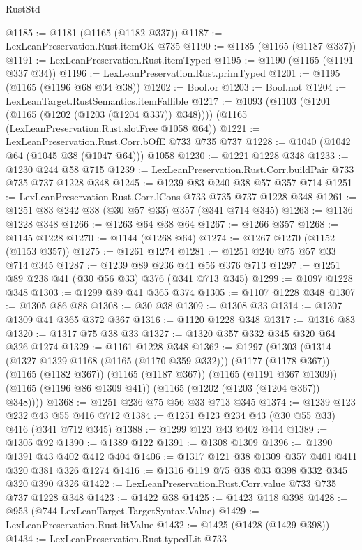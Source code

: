 \begin{lexlean}{RustStd}
\begin{coremodule}
@1185 := @1181 (@1165 (@1182 @337))
@1187 := LexLeanPreservation.Rust.itemOK @735
@1190 := @1185 (@1165 (@1187 @337))
@1191 := LexLeanPreservation.Rust.itemTyped
@1195 := @1190 (@1165 (@1191 @337 @34))
@1196 := LexLeanPreservation.Rust.primTyped
@1201 := @1195 (@1165 (@1196 @68 @34 @38))
@1202 := Bool.or
@1203 := Bool.not
@1204 := LexLeanTarget.RustSemantics.itemFallible
@1217 := @1093
    (@1103 (@1201 (@1165 (@1202 (@1203 (@1204 @337)) @348))))
    (@1165 (LexLeanPreservation.Rust.slotFree @1058 @64))
@1221 := LexLeanPreservation.Rust.Corr.bOfE @733 @735 @737
@1228 := @1040 (@1042 @64 (@1045 @38 (@1047 @64))) @1058
@1230 := @1221 @1228 @348
@1233 := @1230 @244 @58 @715
@1239 := LexLeanPreservation.Rust.Corr.buildPair @733 @735 @737 @1228 @348
@1245 := @1239 @83 @240 @38 @57 @357 @714
@1251 := LexLeanPreservation.Rust.Corr.lCons @733 @735 @737 @1228 @348
@1261 := @1251 @83 @242 @38 (@30 @57 @33) @357 (@341 @714 @345)
@1263 := @1136 @1228 @348
@1266 := @1263 @64 @38 @64
@1267 := @1266 @357
@1268 := @1145 @1228
@1270 := @1144 (@1268 @64)
@1274 := @1267 @1270 (@1152 (@1153 @357))
@1275 := @1261 @1274
@1281 := @1251 @240 @75 @57 @33 @714 @345
@1287 := @1239 @89 @236 @41 @56 @376 @713
@1297 := @1251 @89 @238 @41 (@30 @56 @33) @376 (@341 @713 @345)
@1299 := @1097 @1228 @348
@1303 := @1299 @89 @41 @365 @374
@1305 := @1107 @1228 @348
@1307 := @1305 @86 @88
@1308 := @30 @38
@1309 := @1308 @33
@1314 := @1307 @1309 @41 @365 @372 @367
@1316 := @1120 @1228 @348
@1317 := @1316 @83
@1320 := @1317 @75 @38 @33
@1327 := @1320 @357 @332 @345 @320 @64 @326 @1274
@1329 := @1161 @1228 @348
@1362 := @1297
    (@1303
      (@1314
        (@1327 @1329 @1168 (@1165 (@1170 @359 @332)))
        (@1177 (@1178 @367))
        (@1165 (@1182 @367))
        (@1165 (@1187 @367))
        (@1165 (@1191 @367 @1309))
        (@1165 (@1196 @86 @1309 @41))
        (@1165 (@1202 (@1203 (@1204 @367)) @348))))
@1368 := @1251 @236 @75 @56 @33 @713 @345
@1374 := @1239 @123 @232 @43 @55 @416 @712
@1384 := @1251 @123 @234 @43 (@30 @55 @33) @416 (@341 @712 @345)
@1388 := @1299 @123 @43 @402 @414
@1389 := @1305 @92
@1390 := @1389 @122
@1391 := @1308 @1309
@1396 := @1390 @1391 @43 @402 @412 @404
@1406 := @1317 @121 @38 @1309 @357 @401 @411 @320 @381 @326 @1274
@1416 := @1316 @119 @75 @38 @33 @398 @332 @345 @320 @390 @326
@1422 := LexLeanPreservation.Rust.Corr.value @733 @735 @737 @1228 @348
@1423 := @1422 @38
@1425 := @1423 @118 @398
@1428 := @953 (@744 LexLeanTarget.TargetSyntax.Value)
@1429 := LexLeanPreservation.Rust.litValue
@1432 := @1425 (@1428 (@1429 @398))
@1434 := LexLeanPreservation.Rust.typedLit @733

\end{coremodule}
\end{lexlean}
